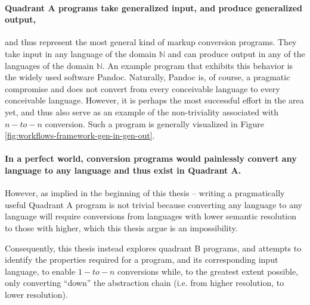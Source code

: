 \documentclass{scrreprt}
\begin{document}
\paragraph{Quadrant A programs take generalized input, and produce generalized output,}
and thus represent the most general kind of markup conversion programs. They take input in any language of the domain $\mathbb{N}$ and can produce output in any of the languages of the domain $\mathbb{N}$. An example program that exhibits this behavior is the widely used software Pandoc\footnotePandoc{}. Naturally, Pandoc\footnotePandoc{} is, of course, a pragmatic compromise and does not convert from every conceivable language to every conceivable language. However, it is perhaps the most successful effort in the area yet, and thus also serve as an example of the non-triviality associated with $n-to-n$ conversion. Such a program is generally visualized in Figure \ref{fig:workflows-framework-gen-in-gen-out}.



\paragraph{In a perfect world, conversion programs would painlessly convert any language to any language and thus exist in  Quadrant A.} However, as implied in the beginning of this thesis -- writing a pragmatically useful Quadrant A program is not trivial because converting any language to any language will require conversions from languages with lower semantic resolution to those with higher, which this thesis argue is an impossibility.

Consequently, this thesis instead explores quadrant B programs, and attempts to identify the properties required for a program, and its corresponding input language, to enable $1-to-n$ conversions while, to the greatest extent possible, only converting ``down'' the abstraction chain (i.e. from higher resolution, to lower resolution).


\end{document}
